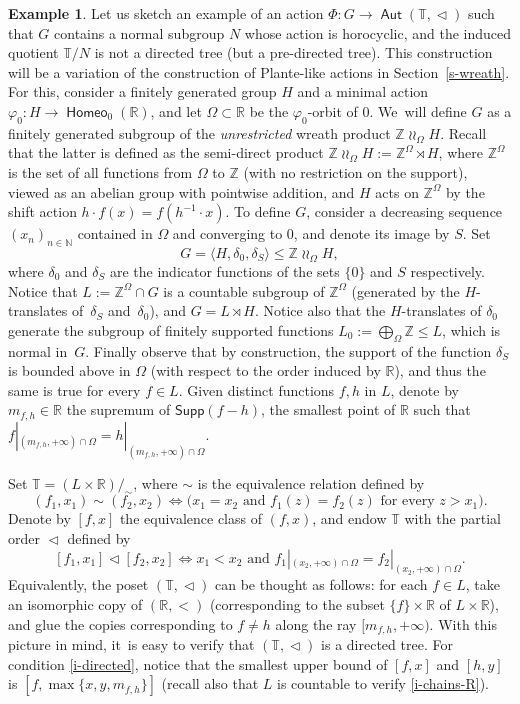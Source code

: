 \documentclass[JEP,XML,SOM,Unicode,NoFloatCountersInSection,published]{cedram}
\theoremstyle{definition}
\newtheorem{ex}[thm]{Example}
\DeclareMathOperator{\Aut}{\mathsf{Aut}}
\DeclareMathOperator{\homeo}{\mathsf{Homeo}}
\DeclareMathOperator{\wrwr}{{\wr\wr}}
\newcommand{\R}{\mathbb{R}}
\newcommand{\N}{\mathbb N}
\newcommand{\Z}{\mathbb Z}
\newcommand{\Tbb}{\mathbb T}
\newcommand{\treeorder}{\mathrel{\triangleleft}}
\begin{document}
\begin{ex} \label{e-predirected}
Let us sketch an example of an action $\Phi\colon G\to\Aut(\mathbb{T,\treeorder})$ such that $G$ contains a normal subgroup $N$ whose action is horocyclic, and the induced quotient $\mathbb{T}/N$ is not a directed tree (but a pre-directed tree). This construction will be a variation of the construction of Plante-like actions in Section~\ref{s-wreath}. For this, consider a finitely generated group $H$ and a minimal action $\varphi_0\colon H\to\homeo_0(\R)$, and let $\Omega\subset\R$ be the $\varphi_0$-orbit of $0$. We~will define $G$ as a finitely generated subgroup of the \emph{unrestricted} wreath product $\Z \wrwr_{\Omega} H$. Recall that the latter is defined as the semi-direct product $\Z \wrwr_\Omega H:=\Z^\Omega\rtimes H$, where $\Z^\Omega$ is the set of all functions from $\Omega$ to $\Z$ (with no restriction on the support), viewed as an abelian group with pointwise addition, and $H$ acts on $\Z^\Omega$ by the shift action $h\cdot f(x)=f(h^{-1}\cdot x)$. To define $G$, consider a decreasing sequence $(x_n)_{n\in\N}$ contained in $\Omega$ and converging to $0$, and denote its image by $S$. Set
\[G=\langle H,\delta_0,\delta_S\rangle\le \Z \wrwr_\Omega H,
\]
where $\delta_0$ and $\delta_S$ are the indicator functions of the sets $\{0\}$ and $S$ respectively. Notice that ${L}:=\Z^\Omega\cap G$ is a countable subgroup of $\Z^\Omega$ (generated by the $H$-translates of~$\delta_S$ and~$\delta_0$), and $G=L\rtimes H$. Notice also that the $H$-translates of $\delta_0$ generate the subgroup of finitely supported functions $L_0:=\bigoplus_\Omega \Z \le L$, which is normal in~$G$. Finally observe that by construction, the support of the function $\delta_S$ is bounded above in $\Omega$ (with respect to the order induced by $\R$), and thus the same is true for every $f\in {L}$. Given distinct functions $f, h$ in $L$, denote by $m_{f, h}\in \R$ the supremum of $\mathsf{Supp}(f-h)$, \ie the smallest point of $\R$ such that $f|_{(m_{f, h}, +\infty)\cap \Omega}=h|_{(m_{f, h}, +\infty)\cap \Omega}$.

Set $\mathbb{T}=(L\times \R)/_\sim$, where $\sim$ is the equivalence relation defined by
\[(f_1,x_1)\sim(f_2,x_2)\iff\Big(x_1=x_2\text{ and }f_1(z)=f_2(z)\text{ for every }z>x_1\Big).
\]
Denote by $[f, x]$ the equivalence class of $(f, x)$, and endow $\Tbb$ with the partial order $\treeorder$ defined by
\[
[f_1,x_1]\treeorder[f_2,x_2]\iff x_1<x_2\text{ and } f_1|_{(x_2, +\infty)\cap \Omega}=f_2|_{(x_2, +\infty)\cap \Omega}.
\]
Equivalently, the poset $(\Tbb, \treeorder)$ can be thought as follows: for each $f\in L$, take an isomorphic copy of $(\R, <)$ (corresponding to the subset $\{f\}\times \R$ of $L\times \R$), and glue the copies corresponding to $f\neq h$ along the ray $[m_{f, h}, +\infty)$. With this picture in mind, it~is easy to verify that $(\Tbb, \treeorder)$ is a directed tree. For condition \eqref{i-directed}, notice that the smallest upper bound of $[f,x]$ and $[h,y]$ is $[f,\max\{x,y,m_{f, h}\}]$ (recall also that $L$ is countable to verify \eqref{i-chains-R}).


\end{ex}
\end{document}
